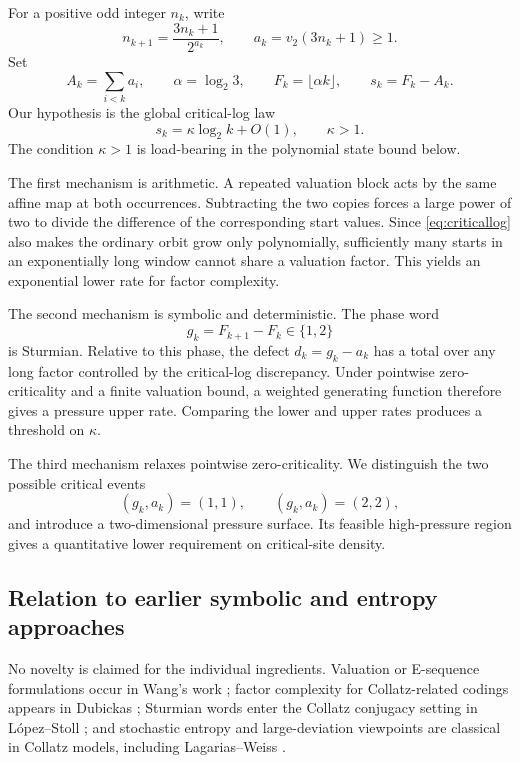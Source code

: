 \documentclass[11pt]{amsart}
\begin{document}
For a positive odd integer \(n_k\), write
\[
 n_{k+1}=\frac{3n_k+1}{2^{a_k}},
 \qquad
 a_k=v_2(3n_k+1)\ge1.
\]
Set
\[
 A_k=\sum_{i<k}a_i,
 \qquad
 \alpha=\log_2 3,
 \qquad
 F_k=\lfloor\alpha k\rfloor,
 \qquad
 s_k=F_k-A_k.
\]
Our hypothesis is the global critical-log law
\begin{equation}\label{eq:criticallog}
 s_k=\kappa\log_2 k+O(1),\qquad \kappa>1.
\end{equation}
The condition \(\kappa>1\) is load-bearing in the polynomial state bound below.

The first mechanism is arithmetic.  A repeated valuation block acts by the same affine map at both occurrences.  Subtracting the two copies forces a large power of two to divide the difference of the corresponding start values.  Since \eqref{eq:criticallog} also makes the ordinary orbit grow only polynomially, sufficiently many starts in an exponentially long window cannot share a valuation factor.  This yields an exponential lower rate for factor complexity.

The second mechanism is symbolic and deterministic.  The phase word
\[
 g_k=F_{k+1}-F_k\in\{1,2\}
\]
is Sturmian.  Relative to this phase, the defect \(d_k=g_k-a_k\) has a total over any long factor controlled by the critical-log discrepancy.  Under pointwise zero-criticality and a finite valuation bound, a weighted generating function therefore gives a pressure upper rate.  Comparing the lower and upper rates produces a threshold on \(\kappa\).

The third mechanism relaxes pointwise zero-criticality.  We distinguish the two possible critical events
\[
 (g_k,a_k)=(1,1),\qquad (g_k,a_k)=(2,2),
\]
and introduce a two-dimensional pressure surface.  Its feasible high-pressure region gives a quantitative lower requirement on critical-site density.

\subsection{Relation to earlier symbolic and entropy approaches}

No novelty is claimed for the individual ingredients.  Valuation or E-sequence formulations occur in Wang's work \cite{Wang2019}; factor complexity for Collatz-related codings appears in Dubickas \cite{Dubickas2009}; Sturmian words enter the Collatz conjugacy setting in L\'opez--Stoll \cite{LopezStoll2009}; and stochastic entropy and large-deviation viewpoints are classical in Collatz models, including Lagarias--Weiss \cite{LagariasWeiss1992}.
\end{document}
